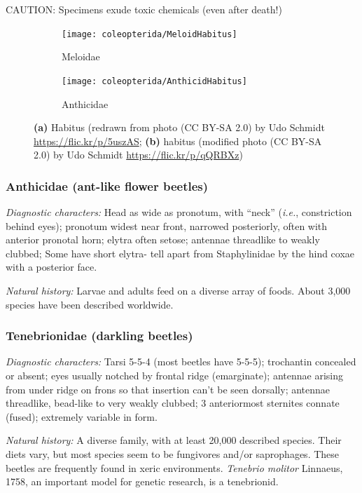 \noindent{}CAUTION: Specimens exude toxic chemicals (even after death!)

\begin{figure}[ht!]
  \centering
\begin{subfigure}[ht!]{0.45\textwidth}
    \texttt{[image: coleopterida/MeloidHabitus]}
  \caption{Meloidae }
  \label{fig:meloid}
\end{subfigure}
    \hfill
\begin{subfigure}[ht!]{0.47\textwidth}
    \texttt{[image: coleopterida/AnthicidHabitus]}
  \caption{Anthicidae}
  \label{fig:anthicid}\end{subfigure}
    \caption{\textbf{(a)} Habitus (redrawn from photo (CC BY-SA 2.0) by Udo Schmidt \url{https://flic.kr/p/5uszAS}; \textbf{(b)} habitus (modified photo (CC BY-SA 2.0) by Udo Schmidt \url{https://flic.kr/p/qQRBXz})}\label{fig:anthmelo}
\end{figure}%

\subsubsection{Anthicidae (ant-like flower beetles)}
\noindent{}\textit{Diagnostic characters:} Head as wide as pronotum, with ``neck'' (\textit{i.e.}, constriction behind eyes); pronotum widest near front, narrowed posteriorly, often with anterior pronotal horn; elytra often setose; antennae threadlike to weakly clubbed; Some have short elytra- tell apart from Staphylinidae by the hind coxae with a posterior face.\vspace{3mm}

\noindent{}\textit{Natural history:} Larvae and adults feed on a diverse array of foods. About 3,000 species have been described worldwide.

\subsubsection{Tenebrionidae (darkling beetles)}
\noindent{}\textit{Diagnostic characters:} Tarsi 5-5-4 (most beetles have 5-5-5); trochantin concealed or absent; eyes usually notched by frontal ridge (emarginate); antennae arising from under ridge on frons so that insertion can't be seen dorsally; antennae threadlike, bead-like to very weakly clubbed; 3 anteriormost sternites connate (fused); extremely variable in form.\vspace{3mm}

\noindent{}\textit{Natural history:} A diverse family, with at least 20,000 described species. Their diets vary, but most species seem to be fungivores and/or saprophages. These beetles are frequently found in xeric environments. \textit{Tenebrio molitor} Linnaeus, 1758, an important model for genetic research, is a tenebrionid.



